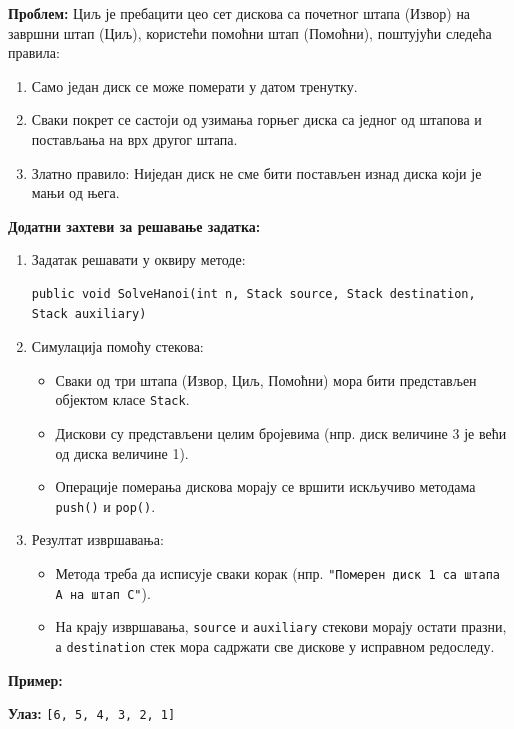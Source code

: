 \textbf{Проблем:} Циљ је пребацити цео сет дискова са почетног штапа (Извор) на завршни штап (Циљ), користећи помоћни штап (Помоћни), поштујући следећа правила:
\begin{enumerate}
	\item Само један диск се може померати у датом тренутку.
	\item Сваки покрет се састоји од узимања горњег диска са једног од штапова и постављања на врх другог штапа.
	\item Златно правило: Ниједан диск не сме бити постављен изнад диска који је мањи од њега.
\end{enumerate}

\textbf{Додатни захтеви за решавање задатка:}
\begin{enumerate}
	\item Задатак решавати у оквиру методе:
	\begin{Verbatim}[fontsize=\small]
public void SolveHanoi(int n, Stack source, Stack destination, Stack auxiliary)
	\end{Verbatim}
	\item Симулација помоћу стекова:
	\begin{itemize}
		\item Сваки од три штапа (Извор, Циљ, Помоћни) мора бити представљен објектом класе \texttt{Stack}.
		\item Дискови су представљени целим бројевима (нпр. диск величине 3 је већи од диска величине 1).
		\item Операције померања дискова морају се вршити искључиво методама \texttt{push()} и \texttt{pop()}.
	\end{itemize}
	\item Резултат извршавања:
	\begin{itemize}
		\item Метода треба да исписује сваки корак (нпр. \texttt{"Померен диск 1 са штапа A на штап C"}).
		\item На крају извршавања, \texttt{source} и \texttt{auxiliary} стекови морају остати празни, а \texttt{destination} стек мора садржати све дискове у исправном редоследу.
	\end{itemize}
\end{enumerate}

\textbf{Пример:}

\textbf{Улаз:} \texttt{[6, 5, 4, 3, 2, 1]}

